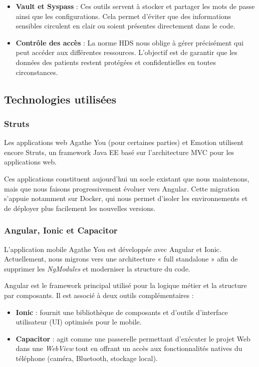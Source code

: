 \documentclass{article}
\begin{document}
\begin{itemize}
    \item \textbf{Vault et Syspass} : Ces outils servent à stocker et partager les mots de passe ainsi que les configurations. Cela permet d'éviter que des informations sensibles circulent en clair ou soient présentes directement dans le code.
    
    \item \textbf{Contrôle des accès} : La norme HDS nous oblige à gérer précisément qui peut accéder aux différentes ressources. L'objectif est de garantir que les données des patients restent protégées et confidentielles en toutes circonstances.
\end{itemize}

\subsection{Technologies utilisées}

\subsubsection{Struts}

Les applications web Agathe You (pour certaines parties) et Emotion utilisent encore Struts, un framework Java EE basé sur l'architecture MVC pour les applications web.

Ces applications constituent aujourd'hui un socle existant que nous maintenons, mais que nous faisons progressivement évoluer vers Angular. Cette migration s'appuie notamment sur Docker, qui nous permet d'isoler les environnements et de déployer plus facilement les nouvelles versions.

\subsubsection{Angular, Ionic et Capacitor}

L'application mobile Agathe You est développée avec Angular et Ionic. Actuellement, nous migrons vers une architecture « full standalone » afin de supprimer les \textit{NgModules} et moderniser la structure du code.

Angular est le framework principal utilisé pour la logique métier et la structure par composants. Il est associé à deux outils complémentaires :

\begin{itemize}
    \item \textbf{Ionic} : fournit une bibliothèque de composants et d'outils d'interface utilisateur (UI) optimisés pour le mobile.
    \item \textbf{Capacitor} : agit comme une passerelle permettant d'exécuter le projet Web dans une \textit{WebView} tout en offrant un accès aux fonctionnalités natives du téléphone (caméra, Bluetooth, stockage local).
\end{itemize}
\end{document}

